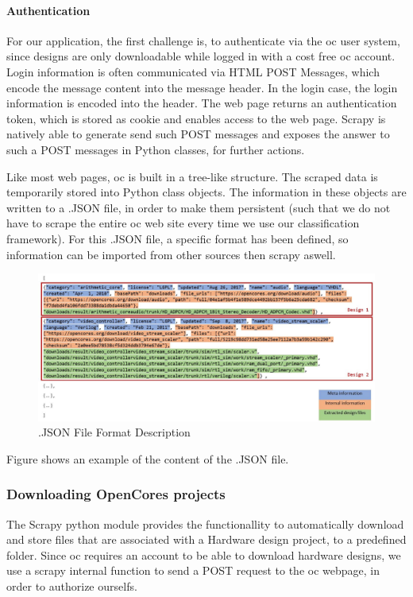 \paragraph*{Authentication \\}

For our application, the first challenge is, to authenticate via the \gls{oc} user system, since designs are only downloadable while logged in with a cost free \gls{oc} account. Login information is often communicated via HTML POST Messages, which encode the message content into the message header. In the login case, the login information is encoded into the header. The web page returns an authentication token, which is stored as cookie and enables access to the web page. Scrapy is natively able to generate send such POST messages and exposes the answer to such a POST messages in Python classes, for further actions. 

Like most web pages, \gls{oc} is built in a tree-like structure.  
The scraped data is temporarily stored into Python class objects. The information 
in these objects are written to a .JSON file, in order to make them persistent (such
that we do not have to scrape the entire \gls{oc} web site every time we use our 
classification framework). For this .JSON file, a specific format has been defined, 
so information can be imported from other sources then scrapy aswell. 

\begin{figure}[h]
	\centering
	\includegraphics[width=\textwidth,keepaspectratio]{fig/jsonFileFormatDescription.JPG}
	\caption{.JSON File Format Description}
	\label{fig:jsonFormat}
\end{figure}

Figure  shows an example of the content of the .JSON file. 

\subsubsection{Downloading OpenCores projects}
The Scrapy python module provides the functionallity to automatically download and
store files that are associated with a Hardware design project, to a predefined
folder. Since \gls{oc} requires an account to be able to download hardware designs, 
we use a scrapy internal function to send a POST request to the \gls{oc} webpage,
in order to authorize ourselfs. 

